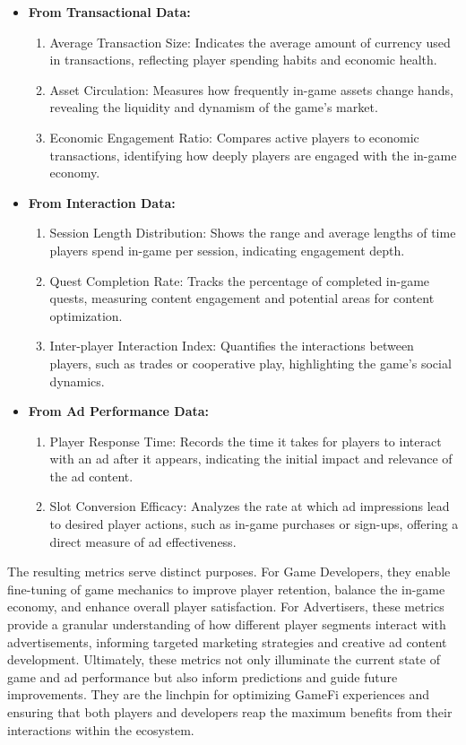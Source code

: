 \begin{itemize}
    \item \textbf{From Transactional Data:}
    \begin{enumerate}
        \item Average Transaction Size: Indicates the average amount of currency used in transactions, reflecting player spending habits and economic health.
\item Asset Circulation: Measures how frequently in-game assets change hands, revealing the liquidity and dynamism of the game's market.
\item Economic Engagement Ratio: Compares active players to economic transactions, identifying how deeply players are engaged with the in-game economy.
 \end{enumerate}

\item \textbf{From Interaction Data:}
 \begin{enumerate}
     \item Session Length Distribution: Shows the range and average lengths of time players spend in-game per session, indicating engagement depth.
\item Quest Completion Rate: Tracks the percentage of completed in-game quests, measuring content engagement and potential areas for content optimization.
\item Inter-player Interaction Index: Quantifies the interactions between players, such as trades or cooperative play, highlighting the game’s social dynamics.
 \end{enumerate}
\item \textbf{From Ad Performance Data:}
 \begin{enumerate}
\item Player Response Time: Records the time it takes for players to interact with an ad after it appears, indicating the initial impact and relevance of the ad content.
\item Slot Conversion Efficacy: Analyzes the rate at which ad impressions lead to desired player actions, such as in-game purchases or sign-ups, offering a direct measure of ad effectiveness.
 \end{enumerate}
\end{itemize}
The resulting metrics serve distinct purposes.
For Game Developers, they enable fine-tuning of game mechanics to improve player retention, balance the in-game economy, and enhance overall player satisfaction.
For Advertisers, these metrics provide a granular understanding of how different player segments interact with advertisements, informing targeted marketing strategies and creative ad content development. Ultimately, these metrics not only illuminate the current state of game and ad performance but also inform predictions and guide future improvements. They are the linchpin for optimizing GameFi experiences and ensuring that both players and developers reap the maximum benefits from their interactions within the ecosystem.

